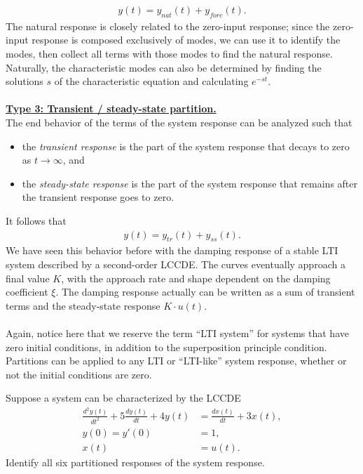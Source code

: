 \documentclass{report}
\begin{document}
\begin{align}
    y(t) = y_{nat}(t) + y_{forc}(t).
\end{align}
The natural response is closely related to the zero-input response; since the zero-input response is composed exclusively of modes, we can use it to identify the modes, 
then collect all terms with those modes to find the natural response. Naturally, the characteristic modes can also be determined by finding the solutions $s$ of the characteristic equation 
and calculating $e^{-st}$.
\\ \\ \noindent
\textbf{\underline{Type 3: Transient / steady-state partition.}} \\[0.25cm]
The end behavior of the terms of the system response can be analyzed such that
\begin{itemize}
    \item the \emph{transient response} is the part of the system response that decays to zero as $t\to\infty$, and
    \item the \emph{steady-state response} is the part of the system response that remains after the transient response goes to zero.
\end{itemize}
It follows that 
\begin{align}
    y(t) = y_{tr}(t) + y_{ss}(t).
\end{align}
We have seen this behavior before with the damping response of a stable LTI system described by a second-order LCCDE. The curves eventually approach a final value $K$, with 
the approach rate and shape dependent on the damping coefficient $\xi$. The damping response actually can be written as a sum of transient terms and the steady-state response $K\cdot u(t)$.
\\ \\
Again, notice here that we reserve the term ``LTI system'' for systems that have zero initial conditions, in addition to the superposition principle condition. Partitions can be applied to any LTI or ``LTI-like'' system response, 
whether or not the initial conditions are zero.
\begin{example}
    Suppose a system can be characterized by the LCCDE 
    \begin{align*}
        \frac{d^2y(t)}{dt^2} + 5\frac{dy(t)}{dt} + 4y(t) &= \frac{dx(t)}{dt} + 3x(t), \\ 
        y(0) = y'(0) &= 1, \\ 
        x(t) &= u(t).
    \end{align*}
    Identify all six partitioned responses of the system response.
\end{example}
\end{document}
